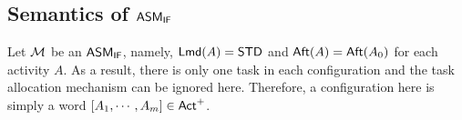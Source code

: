 

\subsection{Semantics of $\textsf{ASM}_\textsf{IF}$}



Let ${\mathcal{M} }$ be an $\textsf{ASM}_\textsf{IF}$, namely, ${\sf Lmd}(A) = \mathsf{STD}$ and ${\sf Aft}(A) = {\sf Aft}(A_0)$ for each activity $A$. As a result, there is only one task in each configuration and the task allocation mechanism can be ignored here. Therefore, a configuration here is simply a word $[A_1,\cdots,A_m]\in{\sf Act}^+$. 



